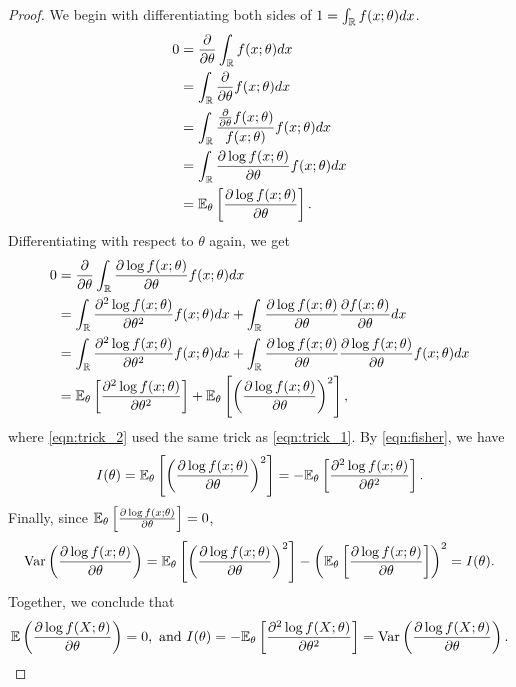 \begin{proof}
We begin with differentiating both sides of $1 = \int_{\mathbb{R}} f(x;\theta) dx$.
\begin{align}
0 &= \frac{\partial}{\partial\theta}\int_{\mathbb{R}} f(x;\theta)dx\nonumber\\
&= \int_{\mathbb{R}} \frac{\partial}{\partial\theta} f(x;\theta)dx\nonumber\\
&= \int_{\mathbb{R}} \frac{\frac{\partial}{\partial\theta} f(x;\theta)}{f(x;\theta)}f(x;\theta) dx\nonumber\\
&= \int_{\mathbb{R}} \frac{\partial \log f(x;\theta)}{\partial\theta}f(x;\theta) dx \label{eqn:trick_1} \\
&= \mathbb{E}_\theta\left[ \frac{\partial \log f(x;\theta)}{\partial\theta} \right]\nonumber.
\end{align}
Differentiating with respect to $\theta$ again, we get
\begin{align}
0 &= \frac{\partial}{\partial\theta}\int_{\mathbb{R}} \frac{\partial \log f(x;\theta)}{\partial\theta}f(x;\theta) dx\nonumber\\
&= \int_{\mathbb{R}} \frac{\partial^2 \log f(x;\theta)}{\partial\theta^2}f(x;\theta) dx + \int_{\mathbb{R}} \frac{\partial \log f(x;\theta)}{\partial\theta}\frac{\partial f(x;\theta)}{\partial\theta} dx\nonumber\\
&= \int_{\mathbb{R}} \frac{\partial^2 \log f(x;\theta)}{\partial\theta^2}f(x;\theta) dx + \int_{\mathbb{R}} \frac{\partial \log f(x;\theta)}{\partial\theta}\frac{\partial \log f(x;\theta)}{\partial\theta}f(x;\theta) dx \label{eqn:trick_2} \\
&= \mathbb{E}_\theta\left[ \frac{\partial^2 \log f(x;\theta)}{\partial\theta^2} \right] + \mathbb{E}_\theta\left[ \left(\frac{\partial \log f(x;\theta)}{\partial\theta}\right)^2 \right],\nonumber
\end{align}
where \cref{eqn:trick_2} used the same trick as \cref{eqn:trick_1}. By \cref{eqn:fisher}, we have
\begin{align*}
I(\theta) = \mathbb{E}_\theta\left[ \left(\frac{\partial \log f(x;\theta)}{\partial\theta}\right)^2 \right] = -\mathbb{E}_\theta\left[ \frac{\partial^2 \log f(x;\theta)}{\partial\theta^2} \right].
\end{align*}
Finally, since $\mathbb{E}_\theta\left[ \frac{\partial \log f(x;\theta)}{\partial\theta} \right] = 0$,
\begin{align*}
\text{Var}\left( \frac{\partial \log f(x;\theta)}{\partial\theta} \right) = \mathbb{E}_\theta\left[ \left(\frac{\partial \log f(x;\theta)}{\partial\theta}\right)^2 \right] - \left( \mathbb{E}_\theta\left[ \frac{\partial \log f(x;\theta)}{\partial\theta} \right] \right)^2 = I(\theta).
\end{align*}
Together, we conclude that
\begin{align*}
\mathbb{E}\left( \frac{\partial\log f(X;\theta)}{\partial \theta} \right) = 0, \text{ and }
I(\theta) = -\mathbb{E}_\theta\left[ \frac{\partial^2\log f(X;\theta)}{\partial \theta^2} \right] = \text{Var}\left( \frac{\partial\log f(X;\theta)}{\partial \theta} \right).
\end{align*}
\end{proof}

